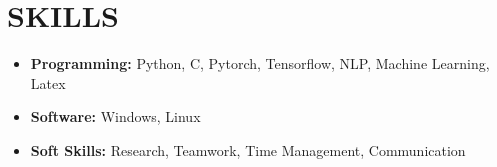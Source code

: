 \documentclass[a4paper,9pt]{extarticle}
\begin{document}
\section*{SKILLS}
\begin{itemize}
    \item \textbf{Programming:} Python, C, Pytorch, Tensorflow, NLP, Machine Learning, Latex
    \item \textbf{Software:} Windows, Linux
    \item \textbf{Soft Skills:} Research, Teamwork, Time Management, Communication
\end{itemize}

\end{document}
